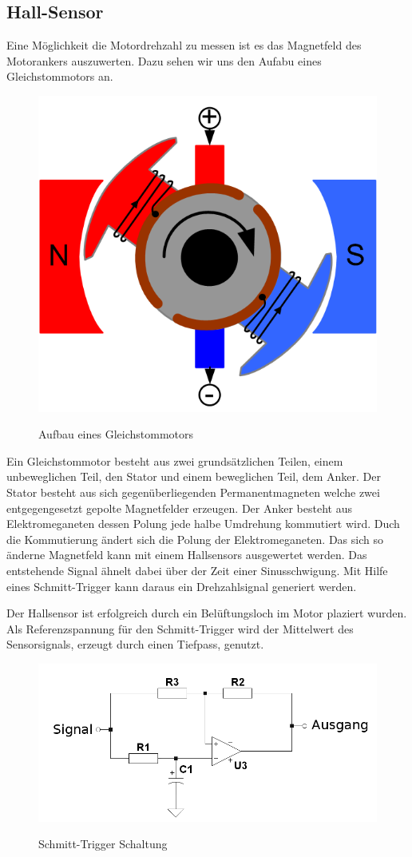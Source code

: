 \subsection{Hall-Sensor}
Eine Möglichkeit die Motordrehzahl zu messen ist es das Magnetfeld des
Motorankers auszuwerten. Dazu sehen wir uns den Aufabu eines Gleichstommotors an.
\begin{figure}[H]
\centering
\includegraphics[width=.5\textwidth]{motor.png}\\
\caption{Aufbau eines Gleichstommotors \cite{gs-motor}}%
\label{fig:aufbau_motor}
\end{figure}
Ein Gleichstommotor besteht aus zwei grundsätzlichen Teilen, einem unbeweglichen Teil, den Stator und einem beweglichen Teil, dem Anker.
Der Stator besteht aus sich gegenüberliegenden Permanentmagneten welche zwei entgegengesetzt gepolte Magnetfelder erzeugen.
Der Anker besteht aus Elektromeganeten dessen Polung jede halbe Umdrehung kommutiert wird. Duch die Kommutierung ändert sich die 
Polung der Elektromeganeten. Das sich so änderne Magnetfeld kann mit einem Hallsensors ausgewertet werden. Das entstehende 
Signal ähnelt dabei über der Zeit einer Sinusschwigung. Mit Hilfe eines Schmitt-Trigger kann daraus ein Drehzahlsignal generiert werden.

Der Hallsensor ist erfolgreich durch ein Belüftungsloch im Motor plaziert wurden. Als Referenzspannung für den Schmitt-Trigger wird der
Mittelwert des Sensorsignals, erzeugt durch einen Tiefpass, genutzt.

\begin{figure}[H]
\centering
\includegraphics[width=.5\textwidth]{schmitt.png}\\
\caption{Schmitt-Trigger Schaltung}%
\label{fig:schmitt}
\end{figure}


